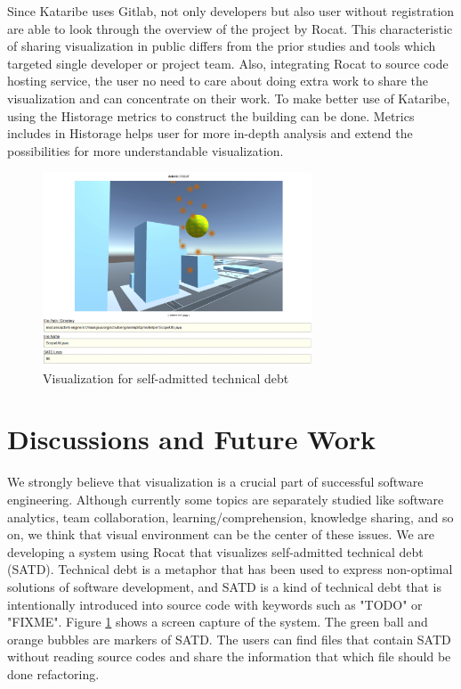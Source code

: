 \documentclass[conference]{IEEEtran}
\newcommand{\figref}[1]{Figure \ref{#1}}
\begin{document}
Since Kataribe uses Gitlab, not only developers but also user without registration are able to look through the overview of the project by Rocat.
This characteristic of sharing visualization in public differs from the prior studies and tools which targeted single developer or project team.
Also, integrating Rocat to source code hosting service, the user no need to care about doing extra work to share the visualization and can concentrate on their work.
To make better use of Kataribe, using the Historage metrics to construct the building can be done.
Metrics includes in Historage helps user for more in-depth analysis and extend the possibilities for more understandable visualization.


\begin{figure}[tb]
\centering
\includegraphics[width=8cm]{satd.pdf}
\caption{Visualization for self-admitted technical debt}
\label{figure:SATD}
\end{figure}

\section{Discussions and Future Work}
We strongly believe that visualization is a crucial part of successful software engineering.
Although currently some topics are separately studied like software analytics, team collaboration, learning/comprehension, knowledge sharing, and so on, we think that visual environment can be the center of these issues.
We are developing a system using Rocat that visualizes self-admitted technical debt (SATD).
Technical debt is a metaphor that has been used to express non-optimal solutions of software development, and SATD is a kind of technical debt that is intentionally introduced into source code with keywords such as "TODO" or "FIXME".
\figref{figure:SATD} shows a screen capture of the system.
The green ball and orange bubbles are markers of SATD.
The users can find files that contain SATD without reading source codes and share the information that which file should be done refactoring.
\end{document}
